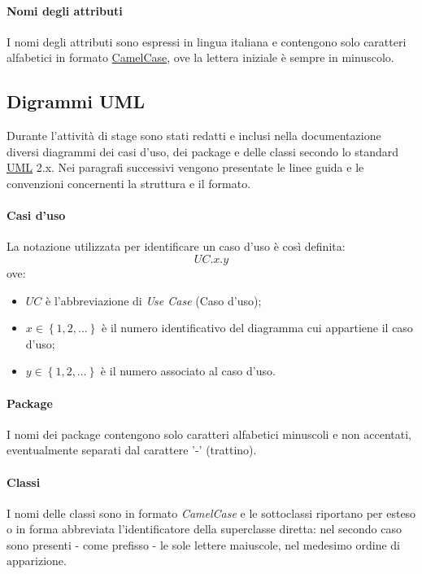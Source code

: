 \paragraph{Nomi degli attributi}
I nomi degli attributi sono espressi in lingua italiana e contengono solo caratteri alfabetici in formato \underline{CamelCase}, ove la lettera iniziale è sempre in minuscolo.

\subsection{Digrammi UML}
Durante l'attività di stage sono stati redatti e inclusi nella documentazione diversi diagrammi dei casi d'uso, dei package e delle classi secondo lo standard \underline{UML} 2.x. Nei paragrafi successivi vengono presentate le linee guida e le convenzioni concernenti la struttura e il formato.

\paragraph{Casi d'uso} La notazione utilizzata per identificare un caso d'uso è così definita:
$$UC.x.y$$
ove:
\begin{itemize}
\item $UC$ è l'abbreviazione di \textit{Use Case} (Caso d'uso);
\item $x \in \left\{1,2,\ldots\right\}$ è il numero identificativo del diagramma cui appartiene il caso d'uso;
\item $y \in \left\{1,2,\ldots\right\}$ è il numero associato al caso d'uso.
\end{itemize}

\paragraph{Package}
I nomi dei package contengono solo caratteri alfabetici minuscoli e non accentati, eventualmente separati dal carattere '-' (trattino).

\paragraph{Classi}
I nomi delle classi sono in formato \textit{CamelCase} e le sottoclassi riportano per esteso o in forma abbreviata l'identificatore della superclasse diretta: nel secondo caso sono presenti - come prefisso - le sole lettere maiuscole, nel medesimo ordine di apparizione.

